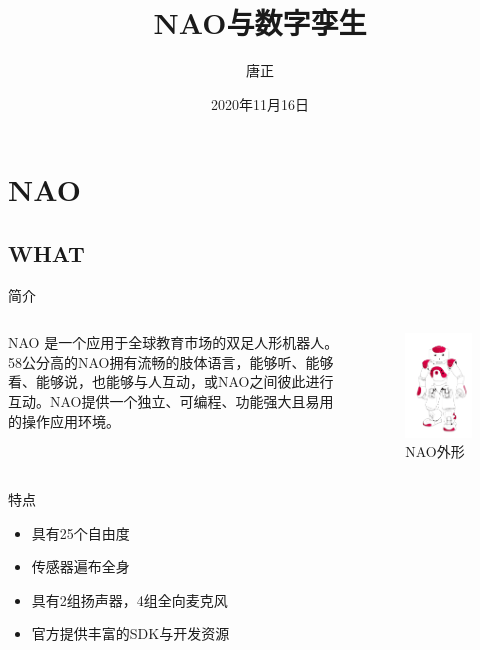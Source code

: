 \documentclass[notheorems, aspectratio=54]{beamer}
\title[NAO与数字孪生]{NAO与数字孪生}
\author{唐正}
\institute[nju]{mf20330073@smail.nju.edu.cn}
\date{2020年11月16日}
\begin{document}
\begin{frame}
    \titlepage
\end{frame}

\section{NAO}
\subsection{WHAT}
\begin{frame}{简介}
    \begin{columns}
        NAO 是一个应用于全球教育市场的双足人形机器人。58公分高的NAO拥有流畅的肢体语言，能够听、能够看、能够说，也能够与人互动，或NAO之间彼此进行互动。NAO提供一个独立、可编程、功能强大且易用的操作应用环境。
	\begin{figure}[htbp]
		\centering
		\includegraphics[scale=0.5]{nao.png}
		\caption{NAO外形}
		\label{figure 1}
	\end{figure}
    \end{columns}
\end{frame}

\begin{frame}{特点}
    \begin{itemize}
        \item 具有25个自由度
        \item 传感器遍布全身
        \item 具有2组扬声器，4组全向麦克风
        \item 官方提供丰富的SDK与开发资源
    \end{itemize}
\end{frame}
\end{document}
